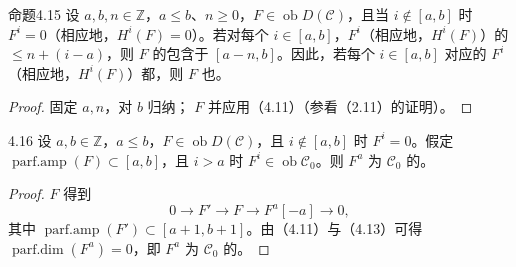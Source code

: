 \begin{SGAresult}{命题}{4.15}
设 $a,b,n\in\mathbb Z$，$a\leq b$、$n\geq0$，$F\in\operatorname{ob}D(\mathcal C)$，且当 $i\notin[a,b]$ 时 $F^i=0$（相应地，$H^i(F)=0$）。若对每个 $i\in[a,b]$，$F^i$（相应地，$H^i(F)$）的 $\leq n+(i-a)$，则 $F$ 的包含于 $[a-n,b]$。因此，若每个 $i\in[a,b]$ 对应的 $F^i$（相应地，$H^i(F)$）都，则 $F$ 也。
\end{SGAresult}
\begin{proof}固定 $a,n$，对 $b$ 归纳； $F$ 并应用（4.11）（参看（2.11）的证明）。\end{proof}

\begin{SGAresult}{}{4.16}
设 $a,b\in\mathbb Z$，$a\leq b$，$F\in\operatorname{ob}D(\mathcal C)$，且 $i\notin[a,b]$ 时 $F^i=0$。假定 $\operatorname{parf.amp}(F)\subset[a,b]$，且 $i>a$ 时 $F^i\in\operatorname{ob}\mathcal C_0$。则 $F^a$ 为 $\mathcal C_0$ 的。
\end{SGAresult}
\begin{proof}
 $F$ 得到
\[0\longrightarrow F'\longrightarrow F\longrightarrow F^a[-a]\longrightarrow0,\]
其中 $\operatorname{parf.amp}(F')\subset[a+1,b+1]$。由（4.11）与（4.13）可得 $\operatorname{parf.dim}(F^a)=0$，即 $F^a$ 为 $\mathcal C_0$ 的。
\end{proof}


